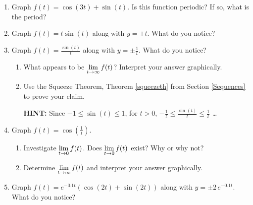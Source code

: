 \begin{enumerate}

\setcounter{enumi}{\value{HW}}

\item  Graph $f(t) = \cos(3t) + \sin(t)$.  Is this function periodic?  If so, what is the period? \label{exploregraphsfirst}

\smallskip

\item  Graph $f(t) = t \sin(t)$ along with  $y = \pm t$. What do you notice? 

\smallskip

\item  Graph $f(t) = \frac{\sin(t)}{t}$ along with  $y = \pm \frac{1}{t}$.   What do you notice?

\begin{enumerate}

\item What appears to be $\displaystyle{\lim_{t \rightarrow \infty} f(t)}$?    Interpret your answer graphically.

\smallskip

\item  Use the Squeeze Theorem, Theorem \ref{squeezeth} from Section \ref{Sequences} to prove your claim.  

\smallskip

\textbf{HINT:}  Since $-1 \leq \sin(t) \leq 1$, for $t>0$, $-\frac{1}{t} \leq \frac{\sin(t)}{t} \leq \frac{1}{t}$ \ldots

\end{enumerate}

\smallskip


\item  Graph $f(t) = \cos\left(\frac{1}{t}\right)$.  

\begin{enumerate}

\item Investigate  $\displaystyle{\lim_{t \rightarrow 0} f(t)}$.  Does $\displaystyle{\lim_{t \rightarrow 0} f(t)}$ exist?  Why or why not?

\smallskip

\item  Determine $\displaystyle{\lim_{t \rightarrow \infty} f(t)}$ and interpret your answer graphically.

\end{enumerate}

\smallskip

\item  Graph $f(t) = e^{-0.1t} \left( \cos(2t) + \sin(2t)\right)$ along with $y = \pm 2 \, e^{-0.1t}$. What do you notice?  \label{exploregraphslast}


\end{enumerate}
